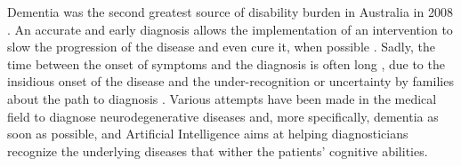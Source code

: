 \documentclass[10pt,twocolumn,letterpaper]{article}
\begin{document}
Dementia was the second greatest source of disability burden in Australia in
2008 \cite{Speechly2008}. An accurate and early diagnosis allows the
implementation of an intervention to slow the progression of the disease and
even cure it, when possible \cite{Speechly2008}. Sadly, the time between the
onset of symptoms and the diagnosis is often long \cite{Fiske2005}, due to the
insidious onset of the disease and the under-recognition or uncertainty by
families about the path to diagnosis \cite{Speechly2008}. Various attempts have
been made in the medical field to diagnose neurodegenerative diseases and, more
specifically, dementia as soon as possible, and Artificial Intelligence aims at
helping diagnosticians recognize the underlying diseases that wither the
patients' cognitive abilities.

\begin{figure}[htb]
\end{figure}
\end{document}
